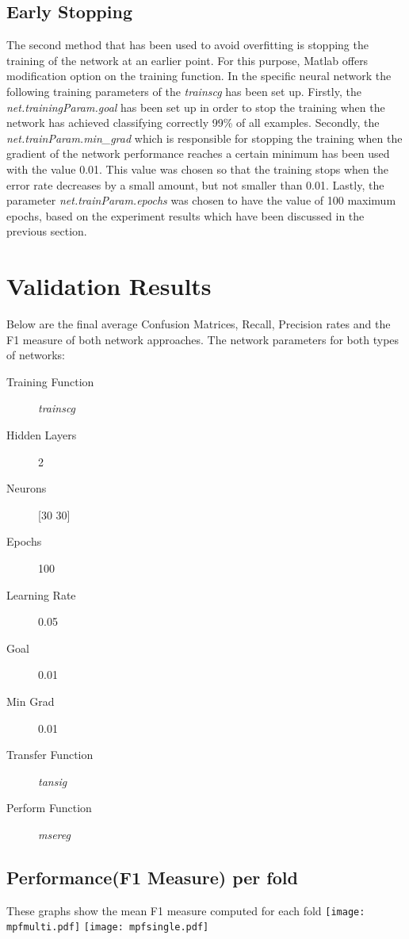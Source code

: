 \documentclass[a4paper,11pt]{article}
\begin{document}
\subsection{Early Stopping}
The second method that has been used to avoid overfitting is stopping the training of the network at an earlier point. For this purpose, Matlab offers modification option on the training function. In the specific neural network the following training parameters of the \emph{trainscg} has been set up. Firstly, the \emph{net.trainingParam.goal} has been set up in order to stop the training when the network has achieved classifying correctly 99\% of all examples. Secondly, the \emph{net.trainParam.min_grad} which is responsible for stopping the training when the gradient of the network performance reaches a certain minimum has been used with the value 0.01. This value was chosen so that the training stops when the error rate decreases by a small amount, but not smaller than 0.01.  Lastly, the parameter \emph{net.trainParam.epochs} was chosen to have the value of 100 maximum epochs, based on the experiment results which have been discussed in the previous section.

\section{Validation Results}
Below are the final average Confusion Matrices, Recall, Precision rates and the F1 measure of both network approaches. The network parameters for both types of networks:

\begin{description}
  \item[Training Function] \emph{trainscg}
  \item[Hidden Layers] 2
  \item[Neurons] [30 30]
  \item[Epochs] 100
  \item[Learning Rate] 0.05
  \item[Goal] 0.01
  \item[Min Grad] 0.01
  \item[Transfer Function] \emph{tansig}
  \item[Perform Function] \emph{msereg}
\end{description}


\subsection{Performance(F1 Measure) per fold}
These graphs show the mean F1 measure computed for each fold
\texttt{[image: mpfmulti.pdf]}
\texttt{[image: mpfsingle.pdf]}
\end{document}
